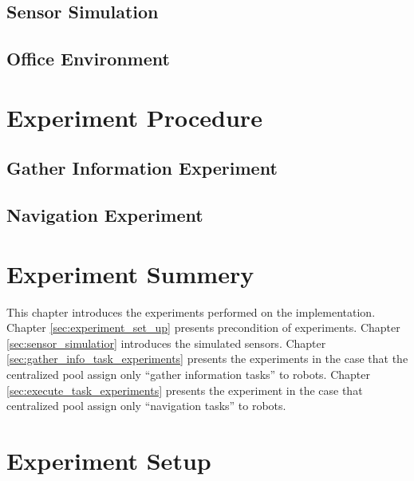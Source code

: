 \subsection{Sensor Simulation}


\subsection{Office Environment}

\section{Experiment Procedure}

\subsection{Gather Information Experiment}

\subsection{Navigation Experiment}

\section{Experiment Summery}



This chapter introduces the experiments performed on the implementation. 
Chapter \ref{sec:experiment_set_up} presents precondition of experiments.
Chapter \ref{sec:sensor_simulatior} introduces the simulated sensors.
Chapter \ref{sec:gather_info_task_experiments} presents the experiments in the case that the centralized pool assign only ``gather information tasks'' to robots.
Chapter \ref{sec:execute_task_experiments} presents the experiment in the case that centralized pool assign only ``navigation tasks'' to robots. 


\section{Experiment Setup}

